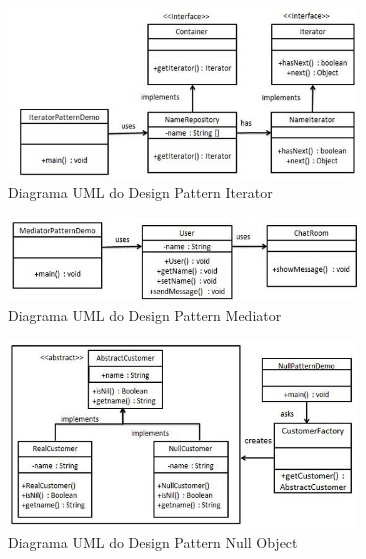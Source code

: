 \begin{figure}[H]
	\centering
	\includegraphics[width = 350px]{figuras/iterator_pattern_uml_diagram}
	\caption {Diagrama UML do Design Pattern Iterator}
	\label{fig:dp_iterator}
\end{figure}
\begin{figure}[H]
	\centering
	\includegraphics[width = 350px]{figuras/mediator_pattern_uml_diagram}
	\caption {Diagrama UML do Design Pattern Mediator}
	\label{fig:dp_mediator}
\end{figure}
\begin{figure}[H]
	\centering
	\includegraphics[width = 350px]{figuras/null_pattern_uml_diagram}
	\caption {Diagrama UML do Design Pattern Null Object}
	\label{fig:dp_null_object}
\end{figure}


